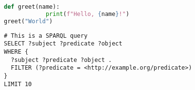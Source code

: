 \documentclass[11pt]{article}
\begin{document}
    \begin{center}
        
    \end{center}

    \begin{lstlisting}[language=Python]
        def greet(name):
            print(f"Hello, {name}!")
greet("World")
\end{lstlisting}

\begin{lstlisting}
# This is a SPARQL query
SELECT ?subject ?predicate ?object
WHERE {
  ?subject ?predicate ?object .
  FILTER (?predicate = <http://example.org/predicate>)
}
LIMIT 10
\end{lstlisting}
\end{document}
